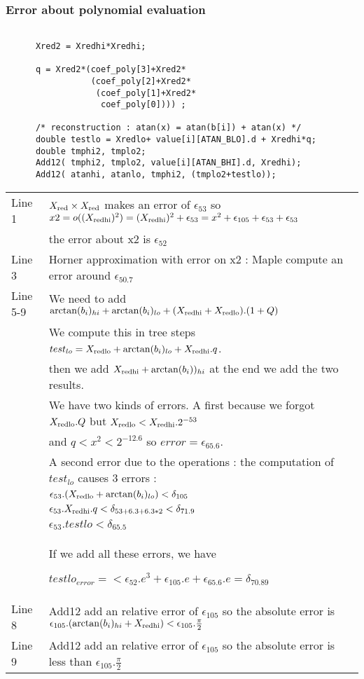 \subsubsection{Error about polynomial evaluation}
\begin{lstlisting}[caption={Polynomial Evaluation},firstnumber=1]

      Xred2 = Xredhi*Xredhi;
      
      q = Xred2*(coef_poly[3]+Xred2*
                 (coef_poly[2]+Xred2*
                  (coef_poly[1]+Xred2*
                   coef_poly[0]))) ;

      /* reconstruction : atan(x) = atan(b[i]) + atan(x) */
      double testlo = Xredlo+ value[i][ATAN_BLO].d + Xredhi*q;
      double tmphi2, tmplo2;
      Add12( tmphi2, tmplo2, value[i][ATAN_BHI].d, Xredhi);
      Add12( atanhi, atanlo, tmphi2, (tmplo2+testlo));

\end{lstlisting}
\begin{tabular}{ll}
Line 1 & $X_{\mathrm{red}} \times X_{\mathrm{red}}$ makes an error of $\epsilon_{53}$ so $x2 =
      o((X_{\mathrm{red hi}})^2) = (X_{\mathrm{red hi}})^2 + \epsilon_{53} = x^2 + \epsilon_{105} +
      \epsilon_{53} + \epsilon_{53} $\\ 
      &the error about x2 is $\epsilon_{52}$ \\
Line 3 & Horner approximation with error on x2 :
      Maple compute an error around $\epsilon_{50.7}$\\ 
Line 5-9 & We need to add $\arctan(b_i)_{hi}+\arctan(b_i)_{lo} +
      (X_{\mathrm{red hi}}+X_{\mathrm{red lo}}).(1+Q)$\\
      &
      We compute this in tree steps $test_{lo}= X_{\mathrm{red lo}}+ \arctan(b_i)_{lo}
      + X_{\mathrm{red hi}}.q$.\\
      & then we add $X_{\mathrm{red hi}}+\arctan(b_i))_{hi}$ at the end we add the two results.\\

      &We have two kinds of errors. A first because we forgot $X_{\mathrm{red lo}}.Q$
      but $X_{\mathrm{red lo}} < X_{\mathrm{red hi}}.2^{-53}$ \\ &and $q<x^2<2^{-12.6}$ so $error =
      \epsilon_{65.6}$. \\
      & A second error due to the operations : the computation of
      $test_{lo}$ causes 3 errors :\\
      & $ \epsilon_{53}.(X_{\mathrm{red lo}}+ \arctan(b_i)_{lo}) < \delta_{105}$\\
      & $\epsilon_{53}.X_{\mathrm{red hi}}.q < \delta_{53+6.3+6.3*2} < \delta_{71.9}$\\
      & $ \epsilon_{53} . testlo < \delta_{65.5}$\\

      &If we add all these errors, we have 

      $testlo_{error} = < \epsilon_{52}.e^3 + \epsilon_{105}.e +
      \epsilon_{65.6}.e = \delta_{70.89}$\\

Line 8 & Add12 add an relative error of $\epsilon_{105}$ so the absolute error is
      $\epsilon_{105}.(\arctan(b_i)_{hi} + X_{\mathrm{red hi}}) < \epsilon_{105}.\frac{\pi}{2}$\\
Line 9 & Add12 add an relative error of $\epsilon_{105}$ so the absolute error is 
       less than $\epsilon_{105}.\frac{\pi}{2}$
\end{tabular}
